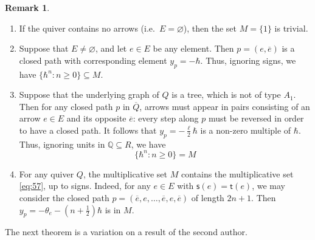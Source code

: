\documentclass[11pt,reqno]{amsart}
\numberwithin{equation}{section}
\theoremstyle{definition}
\newtheorem{Remark}[equation]{Remark}
\newcommand{\QQ}{\mathbb{Q}}
\renewcommand{\emptyset}{\varnothing}
\newcommand{\source}{\mathsf{s}}
\newcommand{\target}{\mathsf{t}}
\newcommand{\quiver}{Q}
\newcommand{\arrowset}{E}
\newcommand{\base}{R}
\begin{document}
\begin{Remark}
    \label{rmk:multiplicativeset}
    \begin{enumerate}
        \item If the quiver contains no arrows (i.e.~$\arrowset = \emptyset$), then the set $M = \{1\}$ is trivial.

        \item Suppose that $\arrowset\neq \emptyset$, and let $e \in \arrowset$ be any element. Then $p = (e, \overline{e})$ is a closed path with corresponding element $y_p= - \hbar$.  Thus, ignoring signs, we have $\{\hbar^n : n \geq 0\} \subseteq M$.
        
        \item Suppose that the underlying graph of $\quiver$ is a tree, which is not of type $A_1$. Then for any closed path $p$ in $\overline{\quiver}$, arrows must appear in pairs consisting of an arrow $e\in \arrowset$ and its opposite $\overline{e}$: every step along $p$ must be reversed in order to have a closed path.  It follows that $y_p = - \frac{\ell}{2} \hbar$ is a non-zero multiple of $\hbar$.  Thus, ignoring units in $\QQ\subseteq \base$, we have $$\{ \hbar^n : n \geq 0\} = M $$

        \item For any quiver $\quiver$, the multiplicative set $M$ contains the multiplicative set \eqref{eq:57}, up to signs. Indeed, for any $e \in \arrowset$ with $\source(e) = \target(e)$, we may consider the closed path $p = (\overline{e}, e,\ldots,  \overline{e}, e,\overline{e})$ of length $2n+1$.  Then $y_p = -\theta_e -(n+\tfrac{1}{2})\hbar$ is in $M$.
    \end{enumerate}
\end{Remark}



The next theorem is a variation  on a result of the second author.
\end{document}
